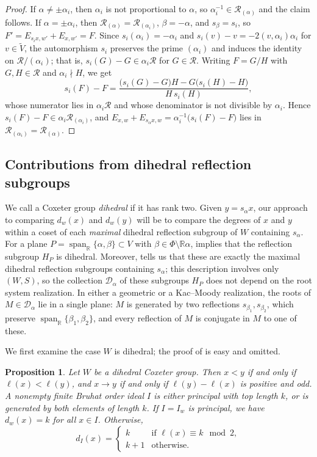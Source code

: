 \documentclass[11pt]{amsart}
\newtheorem{proposition}[proposition]{Proposition}
\theoremstyle{definition}
\theoremstyle{remark}
\numberwithin{equation}{section}
\newcommand{\R}{\mathbb R}
\DeclareMathOperator{\Span}{span}
\begin{document}
\begin{proof}
If $\alpha\ne\pm\alpha_i$, then $\alpha_i$ is not proportional to
$\alpha$, so $\alpha_i^{-1}\in\mathcal{R}_{(\alpha)}$ and the claim
follows. If $\alpha=\pm\alpha_i$, then
$\mathcal{R}_{(\alpha)}=\mathcal{R}_{(\alpha_i)}$, $\beta=-\alpha$,
and $s_\beta=s_i$, so $F'=E_{s_ix,w'}+E_{x,w'}=F$. Since
$s_i(\alpha_i)=-\alpha_i$ and $s_i(v)-v=-2(v,\alpha_i)\alpha_i$ for
$v\in\tilde V$, the automorphism $s_i$ preserves the prime
$(\alpha_i)$ and induces the identity on $\mathcal{R}/(\alpha_i)$;
that is, $s_i(G)-G\in\alpha_i\mathcal{R}$ for $G\in\mathcal{R}$.
Writing $F=G/H$ with $G,H\in\mathcal{R}$ and $\alpha_i\nmid H$, we get
\[
 s_i(F)-F
 =\frac{\bigl(s_i(G)-G\bigr)H-G\bigl(s_i(H)-H\bigr)}{H\,s_i(H)},
\]
whose numerator lies in $\alpha_i\mathcal{R}$ and whose denominator
is not divisible by $\alpha_i$. Hence
$s_i(F)-F\in\alpha_i\mathcal{R}_{(\alpha_i)}$, and
$E_{x,w}+E_{s_\alpha x,w}=\alpha_i^{-1}\bigl(s_i(F)-F\bigr)$ lies in
$\mathcal{R}_{(\alpha_i)}=\mathcal{R}_{(\alpha)}$.
\end{proof}

\subsection{Contributions from dihedral reflection subgroups}\label{sec:dihedral-contributions}
We call a Coxeter group \emph{dihedral} if it has rank two. Given $y=s_{\alpha}x$, our approach to comparing $d_w(x)$ and $d_w(y)$ will be to compare the degrees of $x$ and $y$ within a coset of each \emph{maximal} dihedral reflection subgroup of $W$ containing $s_{\alpha}$. For a plane $P=\Span_\R\{\alpha,\beta\} \subset V$ with $\beta\in\Phi\setminus\R\alpha$, \cite[Lem.~3.17]{DyerThesis} implies that the reflection subgroup $H_P$ is dihedral. Moreover, \cite[Cor.~3.18]{DyerThesis} tells us that these are exactly the maximal dihedral reflection subgroups containing $s_{\alpha}$; this
description involves only $(W,S)$, so the collection $\mathcal{D}_\alpha$ of these subgroups $H_P$ does not depend on the root system realization. In either a geometric or a Kac--Moody realization, the roots of $M\in\mathcal{D}_\alpha$ lie in a single plane: $M$ is generated by two reflections $s_{\beta_1},s_{\beta_2}$, which preserve $\Span_\R\{\beta_1,\beta_2\}$, and every reflection of $M$ is conjugate in $M$ to one of these.

We first examine the case $W$ is dihedral; the proof of  is easy and omitted.

\begin{proposition}
\label{prop:easy-dihedral}
Let $W$ be a dihedral Coxeter group. Then $x < y$ if and only if $\ell(x)<\ell(y)$, and $x \to y$ if and only if $\ell(y)-\ell(x)$ is positive and odd. A nonempty finite Bruhat order ideal $I$ is either principal with top length $k$, or is generated by both elements of length $k$. If $I=I_w$ is principal, we have $d_w(x)=k$ for all $x \in I$. Otherwise,
\[
d_I(x)=\begin{cases}
    k & \text{if $\ell(x)\equiv k \mod{2}$},\\
    k+1 & \text{otherwise.}
\end{cases}
\]
\end{proposition}
\end{document}
